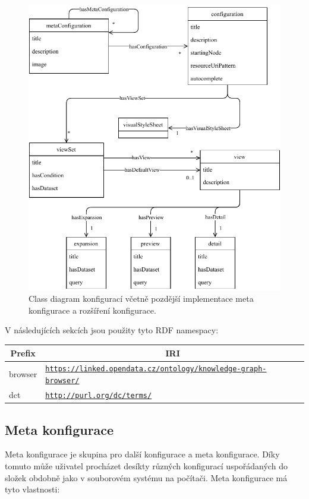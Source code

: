 \begin{figure}
    \centering
    \includegraphics{media/configuration-class-diagram.pdf}
    \caption{Class diagram konfigurací včetně pozdější implementace meta konfigurace a rozšíření konfigurace.}
    \label{fig:configuration-class-diagram}
\end{figure}

\bigskip

V následujících sekcích jsou použity tyto RDF namespacy:
\begin{table}[h] \centering
\begin{tabular}{lp{10cm}}
\toprule
\multicolumn{1}{c}{Prefix} & \multicolumn{1}{c}{IRI}                                      \\
\midrule
browser                    & \texttt{\url{https://linked.opendata.cz/ontology/knowledge-graph-browser/}} \\
dct                        & \texttt{\url{http://purl.org/dc/terms/}}
\end{tabular}
\end{table}

\newpage

\subsection{Meta konfigurace} \label{pozadavky-metakonfigurace}
Meta konfigurace je skupina pro další konfigurace a meta konfigurace. Díky tomuto může uživatel procházet desíkty různých konfigurací uspořádaných do složek obdobně jako v souborovém systému na počítači. Meta konfigurace má tyto vlastnosti:

